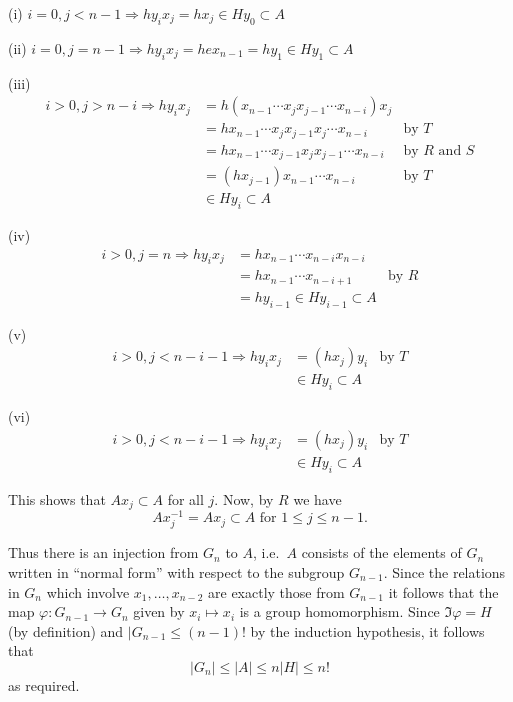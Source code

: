 \begin{eg}
    (i) $i = 0, j< n-1 \Rightarrow hy_ix_j = hx_j \in Hy_0 \subset A$

    (ii) $i=0,j=n-1 \Rightarrow hy_i x_j = hex_{n-1} = hy_1 \in Hy_1 \subset A$

    (iii) \begin{align*} i > 0, j > n-i \Rightarrow hy_ix_j &= h(x_{n-1} \cdots x_j x_{j-1} \cdots x_{n-i}) x_j \\
        &= hx_{n-1} \cdots x_j x_{j-1} x_j \cdots x_{n-i} & \text{by } T\\
        &= hx_{n-1} \cdots x_{j-1} x_j x_{j-1} \cdots x_{n-i} & \text{by } R \text{ and } S\\
        &= (hx_{j-1})x_{n-1}\cdots x_{n-i} & \text{by } T\\
        & \in Hy_i \subset A
    \end{align*}

    (iv)
    \begin{align*} i > 0, j=n \Rightarrow hy_i x_j & = hx_{n-1}\cdots x_{n-i}x_{n-i}\\
        &= hx_{n-1}\cdots x_{n-i+1} & \text{by } R\\
        &= hy_{i-1} \in Hy_{i-1} \subset A
    \end{align*}

    (v)
    \begin{align*} i > 0, j < n-i-1 \Rightarrow hy_ix_j &= (hx_j)y_i & \text{by } T\\
        & \in Hy_i \subset A
    \end{align*}

    (vi)
    \begin{align*} i > 0, j < n-i-1 \Rightarrow hy_i x_j &= (hx_j)y_i & \text{by } T \\
        &\in Hy_i \subset A
    \end{align*}

    This shows that $Ax_j \subset A$ for all $j$. Now, by $R$ we have
    \[Ax_j^{-1} = Ax_j \subset A \text{ for } 1 \le j \le n-1.\]

    Thus there is an injection from $G_n$ to $A$, i.e.~$A$ consists of the
    elements of $G_n$ written in ``normal form'' with respect to the subgroup
    $G_{n-1}$. Since the relations in $G_{n}$ which involve $x_1,\dots,x_{n-2}$
    are exactly those from $G_{n-1}$ it follows that the map $\varphi : G_{n-1}
    \rightarrow G_n$ given by $x_i \mapsto x_i$ is a group homomorphism. Since
    $\Im \varphi = H$ (by definition) and $|G_{n-1} \le (n-1)!$ by the
    induction hypothesis, it follows that \[|G_n| \le |A| \le n|H| \le n!\] as
    required.
\end{eg}

